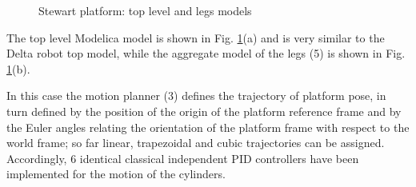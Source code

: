 \documentclass[]{interact}
\theoremstyle{plain}%
\theoremstyle{definition}
\theoremstyle{remark}
\begin{document}
{\begin{figure}
\caption{Stewart platform: top level and legs models} \label{Fig:Stewart_platform_Modelica_top_level}
\end{figure}
The top level Modelica model is shown in Fig. \ref{Fig:Stewart_platform_Modelica_top_level}(a) and is very similar to the Delta robot top model, while the aggregate model of the legs (5) is shown in Fig. \ref{Fig:Stewart_platform_Modelica_top_level}(b).

In this case the motion planner (3) defines the trajectory of platform pose, in turn defined by the position of the origin of the platform reference frame and by the Euler angles relating the orientation of the platform frame with respect to the world frame; so far linear, trapezoidal and cubic trajectories can be assigned. Accordingly, 6 identical classical independent PID controllers have been implemented for the motion of the cylinders.

}
\end{document}
